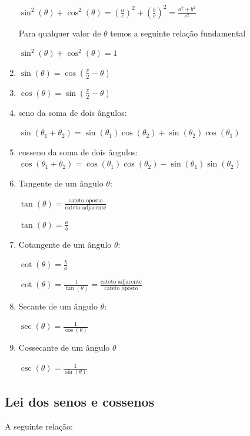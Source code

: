 \begin{multicols*}{2}
\begin{enumerate}[wide, labelwidth=!, labelindent=0pt]
              $\sin^2(\theta) + \cos^2(\theta) =  \left( \frac{a}{c} \right)^2 + \left(  \frac{b}{c} \right)^2 =
                  \frac{a^2 + b^2}{c^2}$

              Para qualquer valor de $\theta$ temos a seguinte relação fundamental

              $\sin^2 (\theta) + \cos^2(\theta) = 1$

        \item $\sin(\theta)  = \cos \left( \frac{\pi}{2} - \theta\right)$
        \item $\cos(\theta)  = \sin \left( \frac{\pi}{2} - \theta\right)$
        \item seno da soma de dois ângulos:

              $\sin(\theta_1 + \theta_2) = \sin(\theta_1) \cos(\theta_2) + \sin( \theta_2) \cos(\theta_1)$

        \item cosseno da soma de dois ângulos:
              $\cos(\theta_1 + \theta_2) = \cos(\theta_1) \cos(\theta_2) - \sin(\theta_1) \sin(\theta_2)$

        \item Tangente de um ângulo $\theta$:

              $\tan(\theta) = \frac{\text{cateto oposto} }{\text{cateto adjacente}}$

              $\tan(\theta) = \frac{a}{b}$

        \item Cotangente de um ângulo $\theta$:

              $\cot(\theta) = \frac{b}{a}$

              $\cot(\theta) = \frac{1}{\tan(\theta)} = \frac{\text{cateto adjacente}}{\text{cateto oposto}}$

        \item Secante de um ângulo $\theta$:

              $\sec(\theta) = \frac{1}{\cos(\theta)} $

        \item Cossecante de um ângulo $\theta$

              $\csc(\theta) = \frac{1}{\sin(\theta)}$
    \end{enumerate}

    \subsection*{Lei dos senos e cossenos}

    A seguinte relação:




\end{multicols*}
